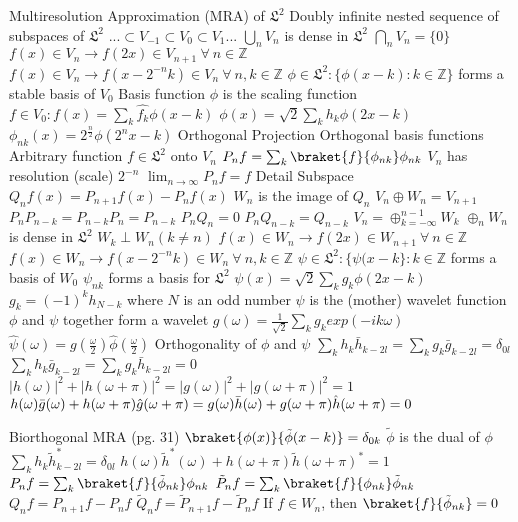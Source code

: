 \documentclass[14pt]{extarticle}
\begin{document}
\begin{outline}
			\2	Multiresolution Approximation (MRA) of $\mathfrak{L}^2$
				\3	Doubly infinite nested sequence of subspaces of $\mathfrak{L}^2$
					\4	$... \subset V_{-1} \subset V_0 \subset V_1 ...$
				\3	$\bigcup_n V_n$ is dense in $\mathfrak{L}^2$
				\3	$\bigcap_n V_n = \{0\}$
				\3	$f(x) \in V_n \rightarrow f(2x) \in V_{n+1}~\forall~n\in \mathbb{Z}$
				\3	$f(x) \in V_n \rightarrow f(x - 2^{-n}k) \in V_n~\forall~n,k \in \mathbb{Z}$
				\3	$\phi \in \mathfrak{L}^2 : \{\phi(x - k) : k \in \mathbb{Z}\}$ forms a stable basis of $V_0$
				\3	Basis function $\phi$ is the scaling function
				\3	$f \in V_0 : f(x) = \sum_k \hat{f_k}\phi(x - k)$
				\3	$\phi(x) = \sqrt{2}\sum_k h_k \phi(2x - k)$
				\3	$\phi_{nk}(x) = 2^{\frac{n}{2}} \phi(2^nx - k)$
				\3	Orthogonal Projection 
					\4	Orthogonal basis functions
					\4	Arbitrary function $f \in \mathfrak{L}^2$ onto $V_n$
					\4	$P_nf = \sum_k \braket{f}{\phi_{nk}}\phi_{nk}$
					\4	$V_n$ has resolution (scale) $2^{-n}$
					\4	$\lim_{n \rightarrow \infty} P_nf = f$
				\3	Detail Subspace
					\4	$Q_nf(x) = P_{n+1}f(x) - P_nf(x)$
					\4	$W_n$ is the image of $Q_n$
					\4	$V_n \oplus W_n = V_{n+1}$
					\4	$P_nP_{n-k} = P_{n-k}P_n = P_{n-k}$
					\4	$P_nQ_n = 0$
					\4	$P_nQ_{n-k} = Q_{n-k}$
					\4	$V_n = \oplus_{k = -\infty}^{n-1} W_k$
					\4	$\oplus_nW_n$ is dense in $\mathfrak{L}^2$
					\4	$W_k \perp W_n (k \ne n)$
					\4	$f(x) \in W_n \rightarrow f(2x) \in W_{n+1}~\forall~n\in \mathbb{Z}$
					\4	$f(x) \in W_n \rightarrow f(x - 2^{-n}k) \in W_n~\forall~n,k \in \mathbb{Z}$
				\3	$\psi \in \mathfrak{L}^2 : \{\psi(x - k\} : k \in \mathbb{Z}$ forms a basis of $W_0$
				\3	$\psi_{nk}$ forms a basis for $\mathfrak{L}^2$
				\3	$\psi(x) = \sqrt{2} \sum_k g_k \phi(2x - k)$
				\3	$g_k = (-1)^kh_{N-k}$ where $N$ is an odd number
				\3	$\psi$ is the (mother) wavelet function
				\3	$\phi$ and $\psi$ together form a wavelet
				\3	$g(\omega) = \frac{1}{\sqrt{2}}\sum_k g_k exp(-ik\omega)$
				\3	$\hat{\psi}(\omega) = g(\frac{\omega}{2})\hat{\phi}(\frac{\omega}{2})$
				\3	Orthogonality of $\phi$ and $\psi$
					\4	$\sum_k h_k \bar{h}_{k-2l} = \sum_kg_k\bar{g}_{k-2l} = \delta_{0l}$
					\4	$\sum_k h_k \bar{g}_{k-2l} = \sum_kg_k\bar{h}_{k-2l} = 0$
					\4	$|h(\omega)|^2 + |h(\omega + \pi)|^2 = |g(\omega)|^2 + |g(\omega + \pi)|^2 = 1$
					\4	$h(\omega)\bar{g}(\omega) + h(\omega + \pi) \hat{g}(\omega + \pi) = \\ 
							 g(\omega)\bar{h}(\omega) + g(\omega + \pi) \hat{h}(\omega + \pi) = 0$
			
			\2	Biorthogonal MRA (pg. 31)
				\3	$\braket{\phi(x)}{\tilde{\phi}(x - k)}	= \delta_{0k}$
				\3	$\tilde{\phi}$ is the dual of $\phi$
				\3	$\sum_k h_k \tilde{h}^*_{k-2l} = \delta_{0l}$
				\3	$h(\omega) \tilde{h}^*(\omega) + h(\omega + \pi) \tilde{h}(\omega + \pi)^* = 1$
				\3	$P_nf = \sum_k \braket{f}{\tilde{\phi}_{nk}}\phi_{nk}$
				\3	$\tilde{P}_nf = \sum_k \braket{f}{\phi_{nk}}\tilde{\phi}_{nk}$
				\3	$Q_nf = P_{n+1}f - P_nf$
				\3	$\tilde{Q}_nf = \tilde{P}_{n+1}f - \tilde{P}_nf$
				\3	If $f \in W_n$, then $\braket{f}{\tilde{\phi}_{nk}} = 0$


\end{outline}
\end{document}
